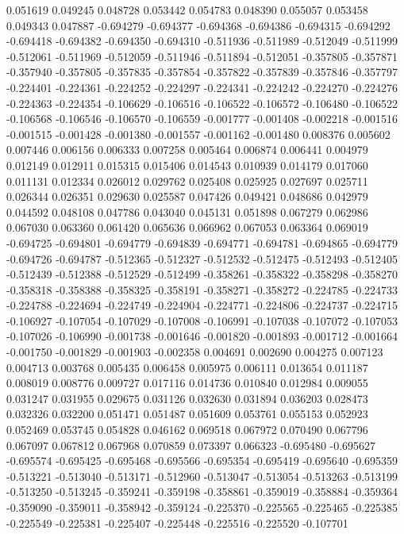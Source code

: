 0.051619
0.049245
0.048728
0.053442
0.054783
0.048390
0.055057
0.053458
0.049343
0.047887
-0.694279
-0.694377
-0.694368
-0.694386
-0.694315
-0.694292
-0.694418
-0.694382
-0.694350
-0.694310
-0.511936
-0.511989
-0.512049
-0.511999
-0.512061
-0.511969
-0.512059
-0.511946
-0.511894
-0.512051
-0.357805
-0.357871
-0.357940
-0.357805
-0.357835
-0.357854
-0.357822
-0.357839
-0.357846
-0.357797
-0.224401
-0.224361
-0.224252
-0.224297
-0.224341
-0.224242
-0.224270
-0.224276
-0.224363
-0.224354
-0.106629
-0.106516
-0.106522
-0.106572
-0.106480
-0.106522
-0.106568
-0.106546
-0.106570
-0.106559
-0.001777
-0.001408
-0.002218
-0.001516
-0.001515
-0.001428
-0.001380
-0.001557
-0.001162
-0.001480
0.008376
0.005602
0.007446
0.006156
0.006333
0.007258
0.005464
0.006874
0.006441
0.004979
0.012149
0.012911
0.015315
0.015406
0.014543
0.010939
0.014179
0.017060
0.011131
0.012334
0.026012
0.029762
0.025408
0.025925
0.027697
0.025711
0.026344
0.026351
0.029630
0.025587
0.047426
0.049421
0.048686
0.042979
0.044592
0.048108
0.047786
0.043040
0.045131
0.051898
0.067279
0.062986
0.067030
0.063360
0.061420
0.065636
0.066962
0.067053
0.063364
0.069019
-0.694725
-0.694801
-0.694779
-0.694839
-0.694771
-0.694781
-0.694865
-0.694779
-0.694726
-0.694787
-0.512365
-0.512327
-0.512532
-0.512475
-0.512493
-0.512405
-0.512439
-0.512388
-0.512529
-0.512499
-0.358261
-0.358322
-0.358298
-0.358270
-0.358318
-0.358388
-0.358325
-0.358191
-0.358271
-0.358272
-0.224785
-0.224733
-0.224788
-0.224694
-0.224749
-0.224904
-0.224771
-0.224806
-0.224737
-0.224715
-0.106927
-0.107054
-0.107029
-0.107008
-0.106991
-0.107038
-0.107072
-0.107053
-0.107026
-0.106990
-0.001738
-0.001646
-0.001820
-0.001893
-0.001712
-0.001664
-0.001750
-0.001829
-0.001903
-0.002358
0.004691
0.002690
0.004275
0.007123
0.004713
0.003768
0.005435
0.006458
0.005975
0.006111
0.013654
0.011187
0.008019
0.008776
0.009727
0.017116
0.014736
0.010840
0.012984
0.009055
0.031247
0.031955
0.029675
0.031126
0.032630
0.031894
0.036203
0.028473
0.032326
0.032200
0.051471
0.051487
0.051609
0.053761
0.055153
0.052923
0.052469
0.053745
0.054828
0.046162
0.069518
0.067972
0.070490
0.067796
0.067097
0.067812
0.067968
0.070859
0.073397
0.066323
-0.695480
-0.695627
-0.695574
-0.695425
-0.695468
-0.695566
-0.695354
-0.695419
-0.695640
-0.695359
-0.513221
-0.513040
-0.513171
-0.512960
-0.513047
-0.513054
-0.513263
-0.513199
-0.513250
-0.513245
-0.359241
-0.359198
-0.358861
-0.359019
-0.358884
-0.359364
-0.359090
-0.359011
-0.358942
-0.359124
-0.225370
-0.225565
-0.225465
-0.225385
-0.225549
-0.225381
-0.225407
-0.225448
-0.225516
-0.225520
-0.107701
